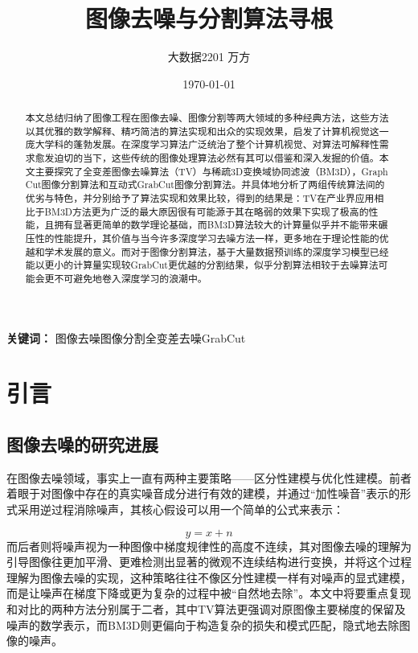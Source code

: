 \documentclass[UTF8]{ctexart}
\title{图像去噪与分割算法寻根}
\author{大数据2201 万方}
\date{\today}
\providecommand{\keywords}[1]{
  \small
  \textbf{关键词：} #1
}
\begin{document}
\maketitle

\begin{abstract}
本文总结归纳了图像工程在图像去噪、图像分割等两大领域的多种经典方法，这些方法以其优雅的数学解释、精巧简洁的算法实现和出众的实现效果，启发了计算机视觉这一庞大学科的蓬勃发展。在深度学习算法广泛统治了整个计算机视觉、对算法可解释性需求愈发迫切的当下，这些传统的图像处理算法必然有其可以借鉴和深入发掘的价值。本文主要探究了全变差图像去噪算法（TV）与稀疏3D变换域协同滤波（BM3D），Graph\\Cut图像分割算法和互动式GrabCut图像分割算法。并具体地分析了两组传统算法间的优劣与特色，并分别给予了算法实现和效果比较，得到的结果是：TV在产业界应用相比于BM3D方法更为广泛的最大原因很有可能源于其在略弱的效果下实现了极高的性能，且拥有显著更简单的数学理论基础，而BM3D算法较大的计算量似乎并不能带来碾压性的性能提升，其价值与当今许多深度学习去噪方法一样，更多地在于理论性能的优越和学术发展的意义。而对于图像分割算法，基于大量数据预训练的深度学习模型已经能以更小的计算量实现较GrabCut更优越的分割结果，似乎分割算法相较于去噪算法可能会更不可避免地卷入深度学习的浪潮中。
\end{abstract}


\keywords{图像去噪\quad 图像分割\quad 全变差去噪\quad GrabCut}


\section{引言}
\subsection{图像去噪的研究进展}
在图像去噪领域，事实上一直有两种主要策略——区分性建模与优化性建模。\cite{tian_deep_2020}前者着眼于对图像中存在的真实噪音成分进行有效的建模，并通过“加性噪音”表示的形式采用逆过程消除噪声，其核心假设可以用一个简单的公式来表示：\par
\[y=x+n\]
而后者则将噪声视为一种图像中梯度规律性的高度不连续，其对图像去噪的理解为引导图像往更加平滑、更难检测出显著的微观不连续结构进行变换，并将这个过程理解为图像去噪的实现，这种策略往往不像区分性建模一样有对噪声的显式建模，而是让噪声在梯度下降或更为复杂的过程中被“自然地去除”。本文中将要重点复现和对比的两种方法分别属于二者，其中TV算法更强调对原图像主要梯度的保留及噪声的数学表示，而BM3D则更偏向于构造复杂的损失和模式匹配，隐式地去除图像的噪声。
\end{document}
